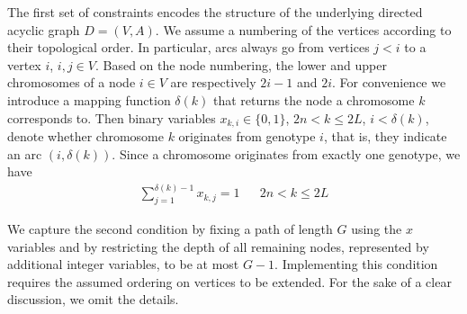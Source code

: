 \documentclass[runningheads]{llncs}
\begin{document}
The first set of constraints encodes the structure of the underlying directed acyclic graph $D=(V,A)$. We assume a numbering of the vertices
according to their topological order. In particular, arcs always go from vertices $j<i$ to a vertex $i$, $i,j\in V$. Based on the node numbering, the lower and upper chromosomes of a node $i \in V$ are respectively $2i-1$ and $2i$. For convenience we introduce a mapping function $\delta(k)$ that returns the node a chromosome $k$ corresponds to.
Then binary variables $x_{k,i}\in\{0,1\}$, $2n < k \leq 2L$, $i<\delta(k)$, denote whether chromosome $k$ originates from genotype $i$, that is, they indicate an arc $(i,\delta(k))$.
Since a chromosome originates from exactly one genotype, we have
\begin{align}
  \label{eq:ilp_x_1}
  \sum_{j=1}^{\delta(k)- 1} x_{k,j} = 1 && 2n < k \leq 2L
\end{align}

We capture the second condition by fixing a path of length $G$ using the $x$ variables and by restricting the depth of all remaining nodes, represented by additional
integer variables, to be at most $G-1$. Implementing this condition requires the assumed ordering on vertices to be extended. For the sake of a clear discussion, we omit the details.
\end{document}
